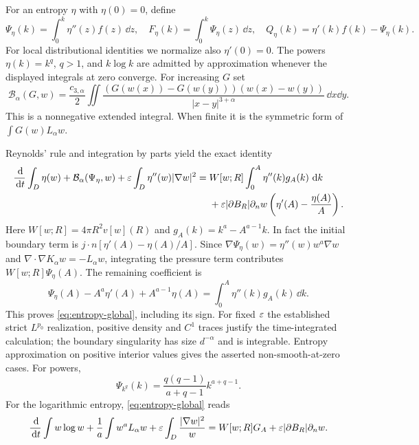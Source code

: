 For an entropy $\eta$ with $\eta(0)=0$, define
\begin{equation}\label{eq:entropy-transforms}
 \Psi_\eta(k)=\int_0^k\eta''(z)f(z)\,\dd z,
 \quad F_\eta(k)=\int_0^k\Psi_\eta(z)\,\dd z,
 \quad Q_\eta(k)=\eta'(k)f(k)-\Psi_\eta(k).
\end{equation}
For local distributional identities we normalize also $\eta'(0)=0$.
The powers $\eta(k)=k^q$, $q>1$, and $k\log k$ are admitted by
approximation whenever the displayed integrals at zero converge.
For increasing $G$ set
\begin{equation}\label{eq:pair}
 \mathcal B_\alpha(G,w)=\frac{c_{3,\alpha}}2
 \iint\frac{(G(w(x))-G(w(y)))(w(x)-w(y))}
 {|x-y|^{3+\alpha}}\,\dd x\dd y.
\end{equation}
This is a nonnegative extended integral. When finite it is the symmetric
form of $\int G(w)L_\alpha w$.

Reynolds' rule and integration by parts yield the exact identity
\begin{align}
 \frac{\,\mathrm d}{\,\mathrm d t}\int_D\eta(w)
 +\mathcal B_\alpha(\Psi_\eta,w)
 +\varepsilon\int_D\eta''(w)|\nabla w|^2
 ={}&W[w;R]\int_0^A\eta''(k)g_A(k)\,\,\mathrm d k\nonumber\\
 &+\varepsilon|\partial B_R|\partial_nw
       \left(\eta'(A)-\frac{\eta(A)}A\right).
                                                        \label{eq:entropy-global}
\end{align}
Here $W[w;R]=4\pi R^2v[w](R)$ and
$g_A(k)=k^a-A^{a-1}k$.
In fact the initial boundary term is
$j\cdot n[\eta'(A)-\eta(A)/A]$. Since
$\nabla\Psi_\eta(w)=\eta''(w)w^a\nabla w$ and
$\nabla\cdot\nabla K_\alpha w=-L_\alpha w$, integrating the pressure
term contributes $W[w;R]\Psi_\eta(A)$.
The remaining coefficient is
\[
 \Psi_\eta(A)-A^a\eta'(A)+A^{a-1}\eta(A)
 =\int_0^A\eta''(k)g_A(k)\,\dd k.
\]
This proves \eqref{eq:entropy-global}, including its sign. For fixed
$\varepsilon$ the established strict $L^{p_0}$ realization, positive density and
$C^1$ traces justify the time-integrated calculation; the boundary
singularity has size $d^{-\alpha}$ and is integrable. Entropy approximation
on positive interior values gives the asserted non-smooth-at-zero cases.
For powers,
\begin{equation}\label{eq:psi-power}
 \Psi_{k^q}(k)=\frac{q(q-1)}{a+q-1}k^{a+q-1}.
\end{equation}
For the logarithmic entropy, \eqref{eq:entropy-global} reads
\begin{equation}\label{eq:log-identity}
 \frac{\,\mathrm d}{\,\mathrm d t}\int w\log w+
 \frac1a\int w^aL_\alpha w+
 \varepsilon\int_D\frac{|\nabla w|^2}{w}
 =W[w;R]G_A+\varepsilon|\partial B_R|\partial_nw.
\end{equation}


